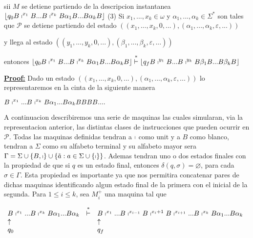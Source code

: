 sii \(M\) se detiene partiendo de la descripcion instantanea
\(\displaystyle \left\lfloor q_{0}B\shortmid ^{x_{1}}B...B\shortmid ^{x_{k}}B\alpha _{1}B...B\alpha _{k}B\right\rfloor \)
(3) Si \(x_{1},...,x_{k}\in \omega \) y \(\alpha _{1},...,\alpha _{k}\in \Sigma ^{\ast }\) son tales que \(\mathcal{P}\) se detiene partiendo del estado
\(\displaystyle \left( (x_{1},...,x_{k},0,...),(\alpha _{1},...,\alpha _{k},\varepsilon ,...)\right) \)

y llega al estado
\(\displaystyle \left( (y_{1},...,y_{k},0,...),(\beta _{1},...,\beta _{k},\varepsilon ,...)\right) \)

entonces
\(\displaystyle \left\lfloor q_{0}B\shortmid ^{x_{1}}B...B\shortmid ^{x_{k}}B\alpha _{1}B...B\alpha _{k}B\right\rfloor \overset{\ast }{\vdash }\left\lfloor q_{f}B\shortmid ^{y_{1}}B...B\shortmid ^{y_{k}}B\beta _{1}B...B\beta _{k}B\right\rfloor \)

\textbf{\underline{Proof:}} Dado un estado \(((x_{1},...,x_{k},0,...),(\alpha _{1},...,\alpha _{k},\varepsilon ,...))\) lo representaremos en la cinta de la siguiente manera


\(\displaystyle B\shortmid ^{x_{1}}...B\shortmid ^{x_{k}}B\alpha _{1}...B\alpha _{k}BBBB.... \)

A continuacion describiremos una serie de maquinas las cuales simularan, via la representacion anterior, las distintas clases de instrucciones que pueden ocurrir en \(\mathcal{P}\). Todas las maquinas definidas tendran a \(\shortmid \) como unit y a \(B\) como blanco, tendran a \(\Sigma \) como su alfabeto terminal y su alfabeto mayor sera \(\Gamma =\Sigma \cup \{B,\shortmid \}\cup \{\tilde{a }:a\in \Sigma \cup \{\shortmid \}\}\). Ademas tendran uno o dos estados finales con la propiedad de que si \(q\) es un estado final, entonces \(\delta (q,\sigma )=\varnothing \), para cada \(\sigma \in \Gamma \). Esta propiedad es importante ya que nos permitira concatenar pares de dichas maquinas identificando algun estado final de la primera con el inicial de la segunda.
Para \(1\leq i\leq k\), sea \(M_{i}^{+}\) una maquina tal que

\(\displaystyle \begin{array}{lcl} B\shortmid ^{x_{1}}...B\shortmid ^{x_{k}}B\alpha _{1}...B\alpha _{k} & \overset{\ast }{\vdash } & B\shortmid ^{x_{1}}...B\shortmid ^{x_{i-1}}B\shortmid ^{x_{i}+1}B\shortmid ^{x_{i+1}}...B\shortmid ^{x_{k}}B\alpha _{1}...B\alpha _{k} \\ \uparrow & & \uparrow \\ q_{0} & & q_{f} \end{array} \)

